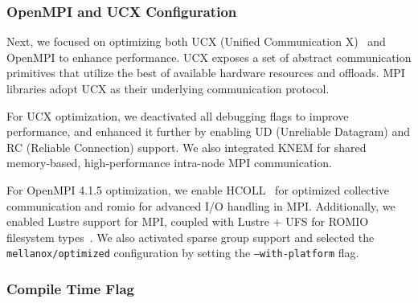 \subsubsection{OpenMPI and UCX Configuration}

Next, we focused on optimizing both UCX (Unified Communication X)~\cite{ucx} and OpenMPI to enhance performance. UCX exposes a set of abstract communication primitives that utilize the best of available hardware resources and offloads. MPI libraries adopt UCX as their underlying communication protocol.

For UCX optimization, we deactivated all debugging flags to improve performance, and enhanced it further by enabling UD (Unreliable Datagram) and RC (Reliable Connection) support. We also integrated KNEM for shared memory-based, high-performance intra-node MPI communication.

For OpenMPI 4.1.5 optimization, we enable HCOLL~\cite{hcoll} for optimized collective communication and romio for advanced I/O handling in MPI. Additionally, we enabled Lustre support for MPI, coupled with Lustre $+$ UFS for ROMIO filesystem types~\cite{ROMIO}. We also activated sparse group support and selected the \texttt{mellanox/optimized} configuration by setting the \texttt{--with-platform} flag.


\subsubsection{Compile Time Flag}

